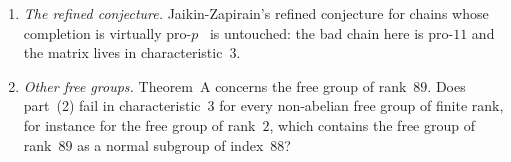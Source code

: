\begin{enumerate}[label=\arabic*.,leftmargin=2em]
\item \emph{The refined conjecture.} Jaikin-Zapirain's refined conjecture for chains whose completion is virtually
pro-$p$~\cite{JaikinBlog2024} is untouched: the bad chain here is pro-$11$ and the matrix lives in characteristic~$3$.

\item \emph{Other free groups.} Theorem~A concerns the free group of rank~$89$. Does part~(2) fail in characteristic~$3$
for every non-abelian free group of finite rank, for instance for the free group of rank~$2$, which contains the free
group of rank~$89$ as a normal subgroup of index~$88$?
\end{enumerate}
